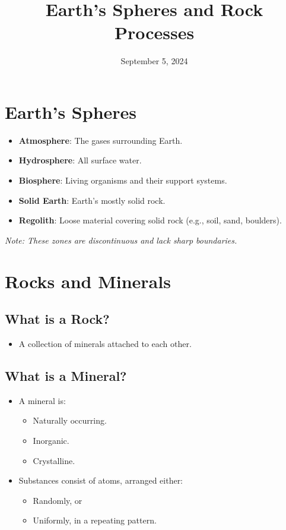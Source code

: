 \documentclass[12pt]{article}
\title{Earth's Spheres and Rock Processes}
\author{}
\date{September 5, 2024}
\begin{document}
\maketitle

\section*{Earth's Spheres}
\begin{itemize}
    \item \textbf{Atmosphere}: The gases surrounding Earth.
    \item \textbf{Hydrosphere}: All surface water.
    \item \textbf{Biosphere}: Living organisms and their support systems.
    \item \textbf{Solid Earth}: Earth's mostly solid rock.
    \item \textbf{Regolith}: Loose material covering solid rock (e.g., soil, sand, boulders).
\end{itemize}
\textit{Note: These zones are discontinuous and lack sharp boundaries.}

\section*{Rocks and Minerals}
\subsection*{What is a Rock?}
\begin{itemize}
    \item A collection of minerals attached to each other.
\end{itemize}

\subsection*{What is a Mineral?}
\begin{itemize}
    \item A mineral is:
    \begin{itemize}
        \item Naturally occurring.
        \item Inorganic.
        \item Crystalline.
    \end{itemize}
    \item Substances consist of atoms, arranged either:
    \begin{itemize}
        \item Randomly, or
        \item Uniformly, in a repeating pattern.
    \end{itemize}
\end{itemize}
\end{document}
